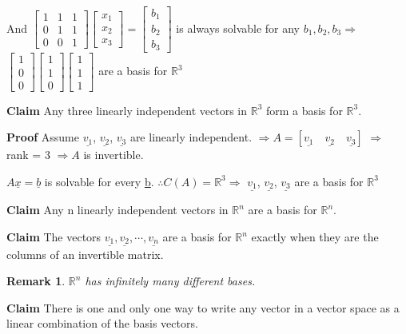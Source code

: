 \documentclass[12pt,a4paper]{article}
\newtheorem*{rem}{Remark}
\newcommand{\Remark}[1]{
  \begin{rem}
    \color{cyan}
    #1
  \end{rem}
}
\begin{document}
And $
\begin{bmatrix}
  1 & 1 & 1 \\
  0 & 1 & 1 \\
  0 & 0 & 1
\end{bmatrix}
\begin{bmatrix}
  x_1 \\
  x_2 \\
  x_3
\end{bmatrix} = 
\begin{bmatrix}
  b_1 \\
  b_2 \\
  b_3
\end{bmatrix}
$ is always solvable for any $b_1, b_2, b_3 \Rightarrow$ 
$
\begin{bmatrix}
  1 \\
  0 \\
  0
\end{bmatrix}
\begin{bmatrix}
  1 \\
  1 \\
  0
\end{bmatrix}
\begin{bmatrix}
  1 \\
  1 \\
  1
\end{bmatrix}
$ are a basis for $\mathbb{R}^3$

\textbf{Claim} Any three linearly independent vectors in $\mathbb {R}^3$ form a basis for $\mathbb{R}^3$.

\textbf{Proof} Assume $\underline{v_1}$, $\underline{v_2}$, $\underline{v_3}$ are linearly independent. $\Rightarrow A = [\underline{v_1} \quad \underline{v_2} \quad \underline{v_3}]$ 
$\Rightarrow$ rank = 3 $\Rightarrow A$ is invertible.

$A\underline{x} = \underline{b}$ is solvable for every \underline{b}. $\therefore C(A) = \mathbb{R}^3 \Rightarrow$
$\underline{v_1}$, $\underline{v_2}$, $\underline{v_3}$ are a basis for $\mathbb{R}^3$

\textbf{Claim} Any n linearly independent vectors in $\mathbb{R}^n$ are a basis for $\mathbb{R}^n$.

\textbf{Claim} The vectors $\underline{v_1}, \underline{v_2}, \cdots, \underline{v_n}$ are a basis for $\mathbb{R}^n$ 
exactly when they are the columns of an invertible matrix.

\Remark{$\mathbb{R}^n$ has infinitely many different bases.}

\textbf{Claim} There is \textcolor{orange!100}{one and only one} way to write any vector in a vector space as a linear combination of the basis vectors.
\end{document}
